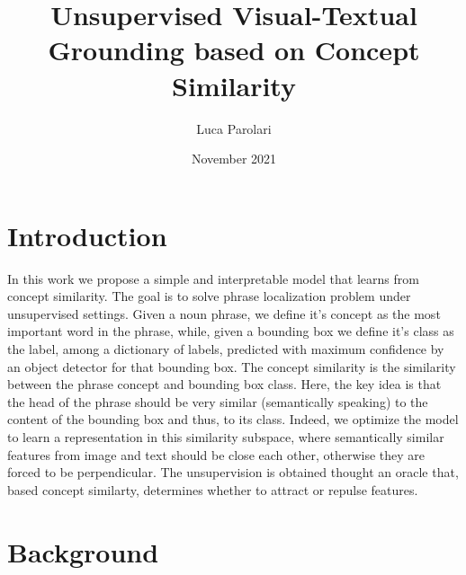 \documentclass{article}
\title{Unsupervised Visual-Textual Grounding based on Concept Similarity}
\author{Luca Parolari}
\date{November 2021}
\begin{document}
\maketitle

\section{Introduction}

In this work we propose a simple and interpretable model that learns
from concept similarity. The goal is to solve phrase localization
problem under unsupervised settings. Given a noun phrase, we define
it's concept as the most important word in the phrase, while, given a
bounding box we define it's class as the label, among a dictionary of
labels, predicted with maximum confidence by an object detector for
that bounding box. The concept similarity is the similarity between
the phrase concept and bounding box class. Here, the key idea is that
the head of the phrase should be very similar (semantically speaking)
to the content of the bounding box and thus, to its class. Indeed, we
optimize the model to learn a representation in this similarity
subspace, where semantically similar features from image and text
should be close each other, otherwise they are forced to be
perpendicular. The unsupervision is obtained thought an oracle that,
based concept similarty, determines whether to attract or repulse
features.


\section{Background}
\end{document}
